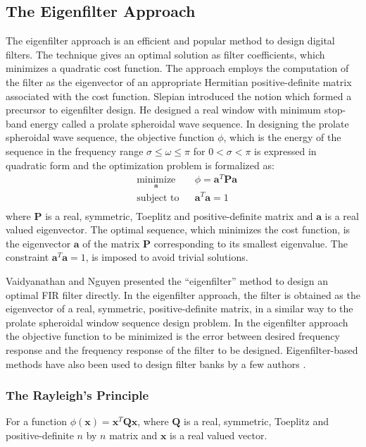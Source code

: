 
\subsection{\label{sub:EigenfilterApproach}The Eigenfilter Approach}
The eigenfilter approach \cite{key-43,key-14} is an efficient and popular method to design
digital filters. The technique gives an optimal solution as filter coefficients, which minimizes a quadratic cost function. The approach employs the computation of the filter as the eigenvector of an appropriate Hermitian positive-definite matrix associated with the cost function. Slepian \cite{key-43} introduced the notion which formed a precursor
to eigenfilter design. He designed a real window with minimum stop-band energy called a prolate spheroidal wave sequence. In designing
the prolate spheroidal wave sequence, the objective function $\phi$,
which is the energy of the sequence in the frequency range $\sigma\leq\omega\leq\pi$
for $0<\sigma<\pi$ is expressed in quadratic form and the optimization
problem is formalized as:
\begin{equation*}
\begin{aligned}
& \underset{\mathbf{a}} {\text{minimize}}
& & \phi=\mathbf{a}^{T}\mathbf{Pa} \\
& \text{subject to}
& & \mathbf{a}^{T}\mathbf{a}=1 \\
\end{aligned}
\end{equation*}
where $\mathbf{P}$ is a real, symmetric, Toeplitz and positive-definite
matrix and $\mathbf{a}$ is a real valued eigenvector. The optimal sequence,
which minimizes the cost function, is the eigenvector $\mathbf{a}$ of
the matrix $\mathbf{P}$ corresponding to its smallest eigenvalue.
The constraint $\mathbf{a}^{T}\mathbf{a}=1$, is imposed to avoid
trivial solutions.

Vaidyanathan and Nguyen \cite{key-14} presented  the {}``eigenfilter''
method to design an optimal FIR filter directly. In the eigenfilter approach, the filter is obtained
as the eigenvector of a real, symmetric, positive-definite matrix,
in a similar way to the prolate spheroidal window sequence design problem.
In the eigenfilter approach the objective function to be minimized
is the error between desired frequency response and the frequency
response of the filter to be designed. Eigenfilter-based
methods have also been used to design filter banks by a few authors \cite{key-15,key-26,key-27,key-29}.
\subsubsection{\label{sub:RayleighPrinciple}The Rayleigh's Principle \cite{key-13}}
For a function $\phi(\mathbf{x}) = \mathbf{x}^{T}\mathbf{Qx}$,
where $\mathbf{Q}$ is a real, symmetric, Toeplitz and positive-definite
$n$ by $n$ matrix and $\mathbf{x}$ is a real valued vector.\\

